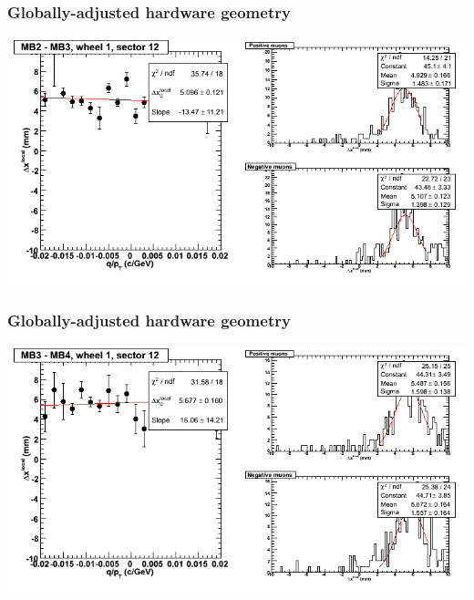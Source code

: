 \documentclass[compress]{beamer}
\begin{document}
\begin{frame}
\frametitle{Globally-adjusted hardware geometry}
\includegraphics[width=\linewidth]{NOV4_segdiffs_HW/dt13_resid_D_12_23.png}
\end{frame}

\begin{frame}
\frametitle{Globally-adjusted hardware geometry}
\includegraphics[width=\linewidth]{NOV4_segdiffs_HW/dt13_resid_D_12_34.png}
\end{frame}
\end{document}
